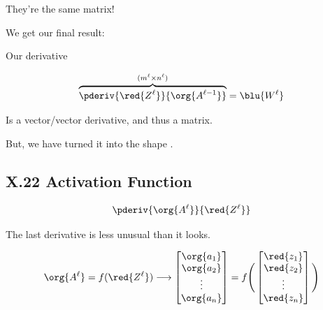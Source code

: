         They're the same matrix!
            
        We get our final result:\\
        
        
        \begin{notation}
            Our derivative
            
            \begin{equation*}
                \overbrace{
                    \pderiv{\red{Z^\ell}} {\org{A^{\ell-1}}}
                }^{ (m^{\ell} \times n^{\ell}) }
                =
                \blu{W^\ell}
            \end{equation*}
        
            Is a vector/vector derivative, and thus a matrix.
            
            But, we have turned it into the shape .
        \end{notation}
            
           
    \secdiv  
         
    \subsection*{X.22 \quad Activation Function}
        
        \begin{equation}
            \pderiv {\org{A^\ell}}   {\red{Z^\ell}}
        \end{equation}
    
        The last derivative is less unusual than it looks.
        
        \begin{equation}
            \org{A^\ell} = f( \red{Z^\ell} ) 
            \longrightarrow
            \begin{bmatrix}
                \org{a_1}\\ \org{a_2}\\ \vdots \\ \org{a_n}
            \end{bmatrix}
            =
            f
            \Bigg(
            \begin{bmatrix}
                \red{z_1}\\\red{z_2}\\ \vdots \\ \red{z_n}
            \end{bmatrix}
            \Bigg)
        \end{equation}
        
